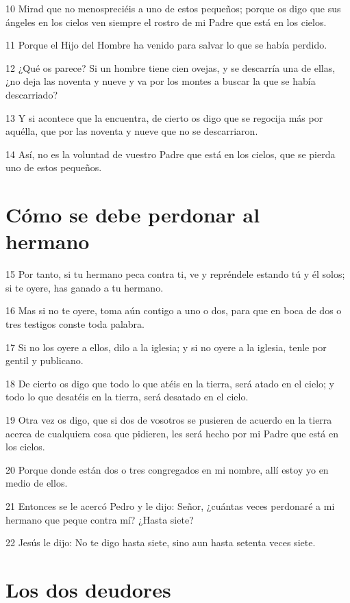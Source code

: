 \par 10 Mirad que no menospreciéis a uno de estos pequeños; porque os digo que sus ángeles en los cielos ven siempre el rostro de mi Padre que está en los cielos.
\par 11 Porque el Hijo del Hombre ha venido para salvar lo que se había perdido.
\par 12 ¿Qué os parece? Si un hombre tiene cien ovejas, y se descarría una de ellas, ¿no deja las noventa y nueve y va por los montes a buscar la que se había descarriado?
\par 13 Y si acontece que la encuentra, de cierto os digo que se regocija más por aquélla, que por las noventa y nueve que no se descarriaron.
\par 14 Así, no es la voluntad de vuestro Padre que está en los cielos, que se pierda uno de estos pequeños.

\section*{Cómo se debe perdonar al hermano}

\par 15 Por tanto, si tu hermano peca contra ti, ve y repréndele estando tú y él solos; si te oyere, has ganado a tu hermano.
\par 16 Mas si no te oyere, toma aún contigo a uno o dos, para que en boca de dos o tres testigos conste toda palabra.
\par 17 Si no los oyere a ellos, dilo a la iglesia; y si no oyere a la iglesia, tenle por gentil y publicano.
\par 18 De cierto os digo que todo lo que atéis en la tierra, será atado en el cielo; y todo lo que desatéis en la tierra, será desatado en el cielo.
\par 19 Otra vez os digo, que si dos de vosotros se pusieren de acuerdo en la tierra acerca de cualquiera cosa que pidieren, les será hecho por mi Padre que está en los cielos.
\par 20 Porque donde están dos o tres congregados en mi nombre, allí estoy yo en medio de ellos.
\par 21 Entonces se le acercó Pedro y le dijo: Señor, ¿cuántas veces perdonaré a mi hermano que peque contra mí? ¿Hasta siete?
\par 22 Jesús le dijo: No te digo hasta siete, sino aun hasta setenta veces siete.

\section*{Los dos deudores}

